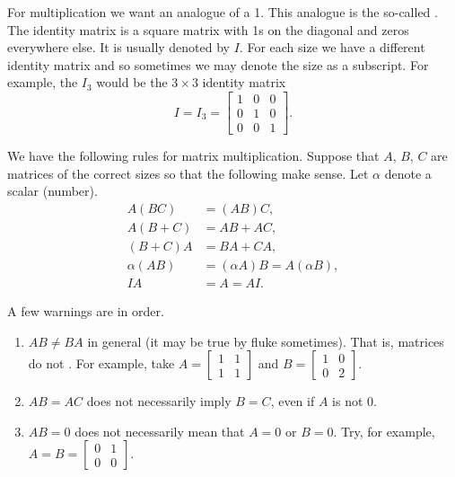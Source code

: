 \documentclass{ximera}
\begin{document}
For multiplication we want an analogue of a 1.  This analogue is the so-called \emph{}. The identity matrix is a square matrix with 1s on the diagonal and zeros everywhere else.  It is usually denoted by $I$. For each size we have a different identity matrix and so sometimes we may denote the size as a subscript.  For example, the $I_3$ would be the $3 \times 3$ identity matrix
\begin{equation*}
    I = I_3 =
    \begin{bmatrix}
        1 & 0 & 0 \\
        0 & 1 & 0 \\
        0 & 0 & 1
    \end{bmatrix} .
\end{equation*}

We have the following rules for matrix multiplication.  Suppose that $A$, $B$, $C$ are matrices of the correct sizes so that the following make sense.  Let $\alpha$ denote a scalar (number).
\begin{align*}
    A(BC) & = (AB)C, \\
    A(B+C) & = AB + AC, \\
    (B+C)A & = BA + CA, \\
    \alpha(AB) & = (\alpha A)B = A(\alpha B), \\
    IA & = A = AI .
\end{align*}

A few warnings are in order.
\begin{enumerate}
    \item $AB \not= BA$ in general (it may be true by fluke sometimes).  That is, matrices do not . For example, take $A = \left[ \begin{smallmatrix} 1 & 1 \\ 1 & 1 \end{smallmatrix} \right]$ and $B = \left[ \begin{smallmatrix} 1 & 0 \\ 0 & 2 \end{smallmatrix} \right]$.
    \item $AB = AC$ does not necessarily imply $B=C$, even if $A$ is not 0.
    \item $AB = 0$ does not necessarily mean that $A=0$ or $B=0$. Try, for example, $A = B = \left[ \begin{smallmatrix} 0 & 1 \\ 0 & 0 \end{smallmatrix} \right]$.
\end{enumerate}
\end{document}
